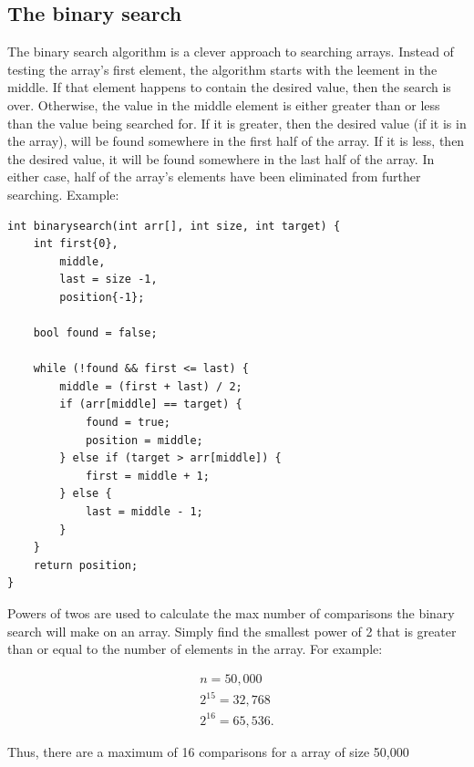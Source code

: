 \documentclass{report}
\begin{document}
    \subsection{The binary search}
    \bigbreak \noindent 
    The binary search algorithm is a clever approach to searching arrays. Instead of testing the array's first element, the algorithm starts with the leement in the middle. If that element happens to contain the desired value, then the search is over. Otherwise, the value in the middle element is either greater than or less than the value being searched for. If it is greater, then the desired value (if it is in the array), will be found somewhere in the first half of the array. If it is less, then the desired value, it will be found somewhere in the last half of the array. In either case, half of the array's elements have been eliminated from further searching.
    \bigbreak \noindent 
    \bigbreak \noindent 
    Example:
    \bigbreak \noindent 
    \sepline
    \begin{verbatim}
int binarysearch(int arr[], int size, int target) {
    int first{0}, 
        middle,
        last = size -1,
        position{-1};

    bool found = false;

    while (!found && first <= last) {
        middle = (first + last) / 2;
        if (arr[middle] == target) {
            found = true;
            position = middle;
        } else if (target > arr[middle]) {
            first = middle + 1;
        } else {
            last = middle - 1;
        }
    }
    return position;
}
    \end{verbatim}
    \sepline
    \bigbreak \noindent 
    Powers of twos are used to calculate the max number of comparisons the binary search will make on an array. Simply find the smallest power of 2 that is greater than or equal to the number of elements in the array. For example:
    \bigbreak \noindent 
    \begin{minipage}[]{0.47\textwidth}
    \begin{align*}
        n = 50,000 \\
        2^{15} = 32,768 \\
        2^{16} = 65,536
    .\end{align*}
    \end{minipage}
    \begin{minipage}[t]{0.47\textwidth}
        Thus, there are a maximum of 16 comparisons for a array of size 50,000
    \end{minipage}
\end{document}
